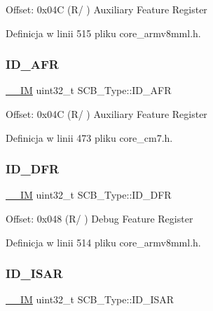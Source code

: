 Offset\+: 0x04C (R/ ) Auxiliary Feature Register 

Definicja w linii 515 pliku core\+\_\+armv8mml.\+h.

\mbox{\label{struct_s_c_b___type_a9c9a1d805f8e99b9fd3ab4f455b6333a}} 
\subsubsection{\texorpdfstring{I\+D\+\_\+\+A\+FR}{ID\_AFR}}
{\footnotesize\ttfamily \hyperlink{core__sc300_8h_a4cc1649793116d7c2d8afce7a4ffce43}{\+\_\+\+\_\+\+IM} uint32\+\_\+t S\+C\+B\+\_\+\+Type\+::\+I\+D\+\_\+\+A\+FR}

Offset\+: 0x04C (R/ ) Auxiliary Feature Register 

Definicja w linii 473 pliku core\+\_\+cm7.\+h.

\mbox{\label{struct_s_c_b___type_ada1d3119c020983fdc949c2ccd406caa}} 
\subsubsection{\texorpdfstring{I\+D\+\_\+\+D\+FR}{ID\_DFR}}
{\footnotesize\ttfamily \hyperlink{core__sc300_8h_a4cc1649793116d7c2d8afce7a4ffce43}{\+\_\+\+\_\+\+IM} uint32\+\_\+t S\+C\+B\+\_\+\+Type\+::\+I\+D\+\_\+\+D\+FR}

Offset\+: 0x048 (R/ ) Debug Feature Register 

Definicja w linii 514 pliku core\+\_\+armv8mml.\+h.

\mbox{\label{struct_s_c_b___type_a5be03d185d9bde32c5b9028f792f8e1e}} 
\subsubsection{\texorpdfstring{I\+D\+\_\+\+I\+S\+AR}{ID\_ISAR}}
{\footnotesize\ttfamily \hyperlink{core__sc300_8h_a4cc1649793116d7c2d8afce7a4ffce43}{\+\_\+\+\_\+\+IM} uint32\+\_\+t S\+C\+B\+\_\+\+Type\+::\+I\+D\+\_\+\+I\+S\+AR}

